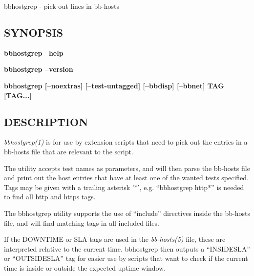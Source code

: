  bbhostgrep - pick out lines in bb-hosts

 \subsection{SYNOPSIS}
\textbf{bbhostgrep --help}
 
\textbf{bbhostgrep --version}
 
\textbf{bbhostgrep [--noextras] [--test-untagged] [--bbdisp] [--bbnet] TAG [TAG...]}


 
\subsection{DESCRIPTION}
\emph{bbhostgrep(1)}
 is for use by extension scripts that need to pick out the entries in
 a bb-hosts file that are relevant to the script. 


  The utility accepts test names as parameters, and will then parse
  the bb-hosts file and print out the host entries that have at least
  one of the wanted tests specified. Tags may be given with a trailing
  asterisk '*', e.g. ``bbhostgrep http*'' is needed to find all http
  and https tags. 



  The bbhostgrep utility supports the use of ``include'' directives
  inside the bb-hosts file, and will find matching tags in all
  included files. 



  If the DOWNTIME or SLA tags are used in the \emph{bb-hosts(5)} file,
  these are interpreted relative to the current time. bbhostgrep then
  outputs a ``INSIDESLA'' or ``OUTSIDESLA'' tag for easier use by
  scripts that want to check if the current time is inside or outside
  the expected uptime window. 



 
